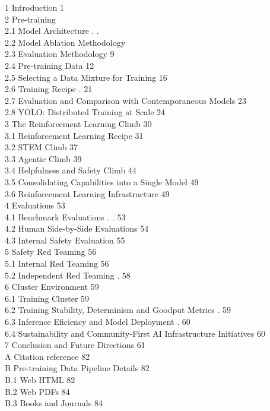 \documentclass[
  10
]{article}
\begin{document}
1 Introduction 1\\
2 Pre-training\\
2.1 Model Architecture . .\\
2.2 Model Ablation Methodology\\
2.3 Evaluation Methodology 9\\
2.4 Pre-training Data 12\\
2.5 Selecting a Data Mixture for Training 16\\
2.6 Training Recipe . 21\\
2.7 Evaluation and Comparison with Contemporaneous Models 23\\
2.8 YOLO: Distributed Training at Scale 24\\
3 The Reinforcement Learning Climb 30\\
3.1 Reinforcement Learning Recipe 31\\
3.2 STEM Climb 37\\
3.3 Agentic Climb 39\\
3.4 Helpfulness and Safety Climb 44\\
3.5 Consolidating Capabilities into a Single Model 49\\
3.6 Reinforcement Learning Infrastructure 49\\
4 Evaluations 53\\
4.1 Benchmark Evaluations . . 53\\
4.2 Human Side-by-Side Evaluations 54\\
4.3 Internal Safety Evaluation 55\\
5 Safety Red Teaming 56\\
5.1 Internal Red Teaming 56\\
5.2 Independent Red Teaming . 58\\
6 Cluster Environment 59\\
6.1 Training Cluster 59\\
6.2 Training Stability, Determinism and Goodput Metrics . 59\\
6.3 Inference Eficiency and Model Deployment . 60\\
6.4 Sustainability and Community-First AI Infrastructure Initiatives
60\\
7 Conclusion and Future Directions 61\\
A Citation reference 82\\
B Pre-training Data Pipeline Details 82\\
B.1 Web HTML 82\\
B.2 Web PDFs 84\\
B.3 Books and Journals 84\\
\end{document}
